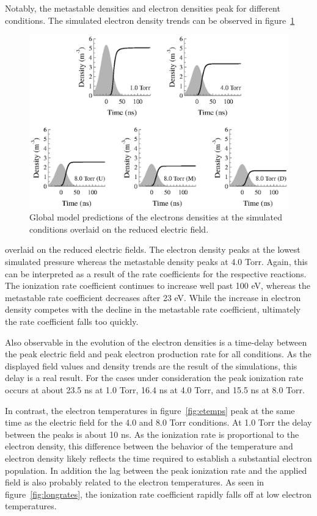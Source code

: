 Notably, the metastable densities and electron densities peak for different
conditions. The simulated electron density trends can be observed in
figure~\ref{fig:necomp}
\begin{figure}
  \centering
  \includegraphics{./chapters/modeling/figures/necomp.eps}
  \caption{Global model predictions of the electrons densities at the simulated
  conditions overlaid on the reduced electric field.}
  \label{fig:necomp}
\end{figure}
overlaid on the reduced electric fields. The electron density peaks at the
lowest simulated pressure whereas the metastable density peaks at 4.0 Torr.
Again, this can be interpreted as a result of the rate coefficients for the
respective reactions. The ionization rate coefficient continues to increase well
past 100 eV, whereas the metastable rate coefficient decreases after 23 eV.
While the increase in electron density competes with the decline in the
metastable rate coefficient, ultimately the rate coefficient falls too quickly.

Also observable in the evolution of the electron densities is a time-delay
between the peak electric field and peak electron production rate for all
conditions. As the displayed field values and density trends are the result of
the simulations, this delay is a real result. For the cases under consideration
the peak ionization rate occurs at about 23.5 ns at 1.0 Torr, 16.4 ns at 4.0
Torr, and 15.5 ns at 8.0 Torr. 

In contrast, the electron temperatures in figure~\ref{fig:etemps} peak at the
same time as the electric field for the 4.0 and 8.0 Torr conditions. At 1.0 Torr
the delay between the peaks is about 10 ns. As the ionization rate is
proportional to the electron density, this difference between the behavior of
the temperature and electron density likely reflects the time required to
establish a substantial electron population. In addition the lag between the
peak ionization rate and the applied field is also probably related to the
electron temperatures. As seen in figure~\ref{fig:longrates}, the ionization
rate coefficient rapidly falls off at low electron temperatures.

